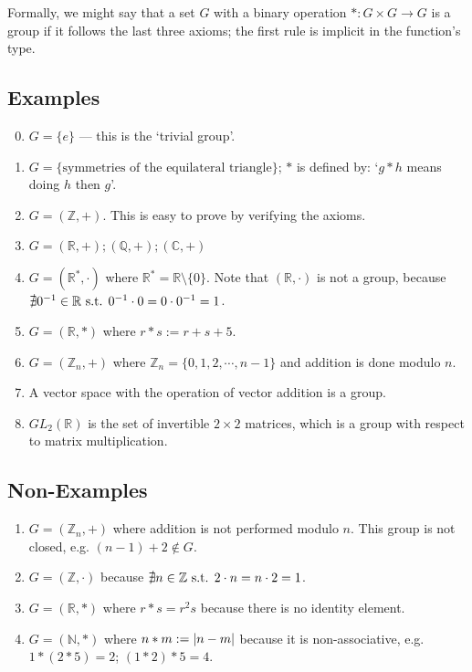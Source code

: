 Formally, we might say that a set $G$ with a binary operation $\ast : G \times G \to G$ is a group if it follows the last three axioms; the first rule is implicit in the function's type.

\subsection{Examples}
\begin{enumerate}
	\setcounter{enumi}{-1}
	\item $G = \{ e \}$ --- this is the `trivial group'.
	\item $G = \{ \text{symmetries of the equilateral triangle} \} $; $\ast$ is defined by: `$g \ast h$ means doing $h$ then $g$'.
	\item $G = (\mathbb Z, +)$. This is easy to prove by verifying the axioms.
	\item $G = (\mathbb R, +); (\mathbb Q, +); (\mathbb C, +)$
	\item $G = (\mathbb R^*, \cdot)$ where $\mathbb R^* = \mathbb R \setminus \{ 0\}$. Note that $(\mathbb R, \cdot)$ is not a group, because $\nexists 0^{-1} \in \mathbb R \text{ s.t. } 0^{-1} \cdot 0 = 0 \cdot 0^{-1} = 1$.
	\item $G = (\mathbb R, \ast)$ where $r \ast s := r + s + 5$.
	\item $G = (\mathbb Z_n, +)$ where $\mathbb Z_n = \{ 0, 1, 2, \cdots, n-1 \}$ and addition is done modulo $n$.
	\item A vector space with the operation of vector addition is a group.
	\item $GL_2(\mathbb R)$ is the set of invertible $2\times 2$ matrices, which is a group with respect to matrix multiplication.
\end{enumerate}

\subsection{Non-Examples}
\begin{enumerate}
	\item $G = (\mathbb Z_n, +)$ where addition is not performed modulo $n$. This group is not closed, e.g. $(n-1) + 2 \notin G$.
	\item $G = (\mathbb Z, \cdot)$ because $\nexists n\in \mathbb Z \text{ s.t. } 2 \cdot n = n \cdot 2 = 1$.
	\item $G = (\mathbb R, \ast)$ where $r \ast s = r^2 s$ because there is no identity element.
	\item $G = (\mathbb N, \ast)$ where $n \ast m := \abs{n - m}$ because it is non-associative, e.g. $1 \ast (2 \ast 5) = 2$; $(1 \ast 2) \ast 5 = 4$.
\end{enumerate}
